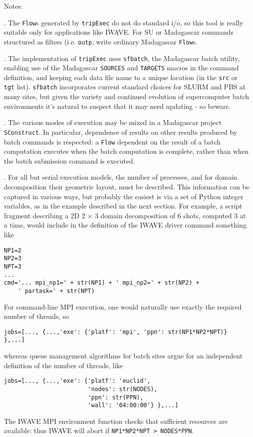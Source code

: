 \noindent Notes:

. The {\tt Flow}s generated by {\tt tripExec} do not do standard i/o, so this tool is really suitable only for applications like IWAVE. For SU or Madagascar commands structured as filters (i.e. {\tt < inp cmd >outp}, write ordinary Madagascar {\tt Flow}s.

. The implementation of {\tt tripExec} uses {\tt sfbatch}, the Madagascar batch utility, enabling use of the Madagascar {\tt SOURCES} and {\tt TARGETS} macros in the command definition, and keeping each data file name to a unique location (in the {\tt src} or {\tt tgt} list). {\tt sfbatch} incorporates current standard choices for SLURM and PBS at many sites, but given the variety and continued evolution of supercomputer batch environments it's natural to suspect that it may need updating - so beware.

. The various modes of execution may be mixed in a Madagascar project {\tt SConstruct}. In particular, dependence of results on other results produced by batch commands is respected: a {\tt Flow} dependent on the result of a batch computation executes when the batch computation is complete, rather than when the batch submission command is executed.

. For all but serial execution models, the number of processes, and for domain decomposition their geometric layout, must be described. This information can be captured in various ways, but probably the easiest is via a set of Python integer variables, as in the example described in the next section. For example, a script fragment describing a 2D 2 $\times$ 3 domain decomposition of 6 shots, computed 3 at a time, would include in the definition of the IWAVE driver command something like
\begin{verbatim}
NP1=2
NP2=3
NPT=3
...
cmd='... mpi_np1=' + str(NP1) + ' mpi_np2=' + str(NP2) +
    ' partask=' + str(NPT)
\end{verbatim}
For command-line MPI execution, one would naturally use exactly the required number of threads, so
\begin{verbatim}
jobs=[..., {...,'exe': {'platf': 'mpi', 'ppn': str(NP1*NP2*NPT)} },...]
\end{verbatim}
whereas queue management algorithms for batch sites argue for an independent definition of the number of threads, like
\begin{verbatim}
jobs=[..., {...,'exe': {'platf': 'euclid',
                        'nodes': str(NODES),
                        'ppn': str(PPN),
                        'wall': '04:00:00'} },...]
\end{verbatim}
The IWAVE MPI environment function checks that sufficient resources are available: thus IWAVE will abort if {\tt NP1*NP2*NPT > NODES*PPN}.

